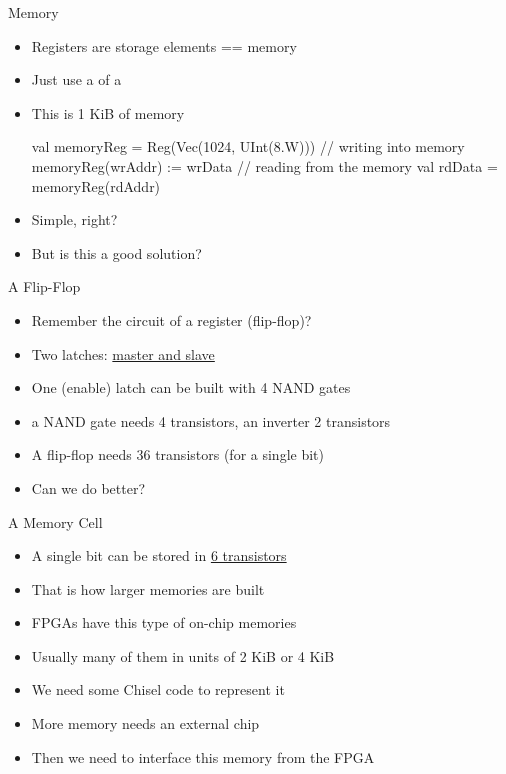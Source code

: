 \begin{frame}[fragile]{Memory}
\begin{itemize}
\item Registers are storage elements == memory
\item Just use a  of a 
\item This is 1 KiB of memory
\begin{chisel}
  val memoryReg = Reg(Vec(1024, UInt(8.W)))
  // writing into memory
  memoryReg(wrAddr) := wrData
  // reading from the memory
  val rdData = memoryReg(rdAddr)
\end{chisel}
\item Simple, right?
\item But is this a good solution?
\end{itemize}
\end{frame}

\begin{frame}[fragile]{A Flip-Flop}
\begin{itemize}
\item Remember the circuit of a register (flip-flop)?
\item Two latches: \href{https://en.wikipedia.org/wiki/Flip-flop_(electronics)#Master%E2%80%93slave_edge-triggered_D_flip-flop}{master and slave}
\item One (enable) latch can be built with 4 NAND gates
\item a NAND gate needs 4 transistors, an inverter 2 transistors
\item A flip-flop needs 36 transistors (for a single bit)
\item Can we do better?
\end{itemize}
\end{frame}

\begin{frame}[fragile]{A Memory Cell}
\begin{itemize}
\item A single bit can be stored in \href{https://en.wikipedia.org/wiki/Static_random-access_memory#/media/File:SRAM_Cell_(6_Transistors).svg}{6 transistors}
\item That is how larger memories are built
\item FPGAs have this type of on-chip memories
\item Usually many of them in units of 2 KiB or 4 KiB
\item We need some Chisel code to represent it
\item More memory needs an external chip
\item Then we need to interface this memory from the FPGA
\end{itemize}
\end{frame}

